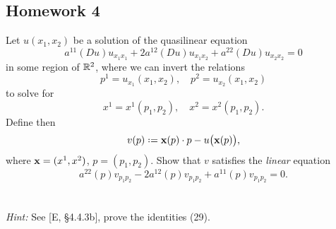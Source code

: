 \subsection{Homework 4}
\begin{problem}
  Let \(u(x_1,x_2)\) be a solution of the quasilinear equation
  \[
    a^{11}(Du)u_{x_1x_1}+ 2a^{12}(Du)u_{x_1x_2}+a^{22}(Du)u_{x_2x_2}=0
  \]
  in some region of \(\mathbb{R}^2\), where we can invert the relations
  \[
    p^1=u_{x_1}(x_1,x_2),\quad p^2=u_{x_2}(x_1,x_2)
  \]
  to solve for
  \[
    x^1=x^1(p_1,p_2),\quad x^2=x^2(p_1,p_2).
  \]
  Define then
  \[
    v(p)\defeq \bfx(p)\cdot p-u\bigl(\bfx(p)\bigr),
  \]
  where \(\mathbf{x}=(x^1,x^2)\), \(p=(p_1,p_2)\). Show that \(v\) satisfies the
  \emph{linear} equation
  \[
    a^{22}(p)v_{p_1p_2}-2a^{12}(p)v_{p_1p_2}+a^{11}(p)v_{p_1p_2}=0.
  \]
  \\\\
  \emph{Hint:} See [E, \S 4.4.3b], prove the identities (29).
\end{problem}
